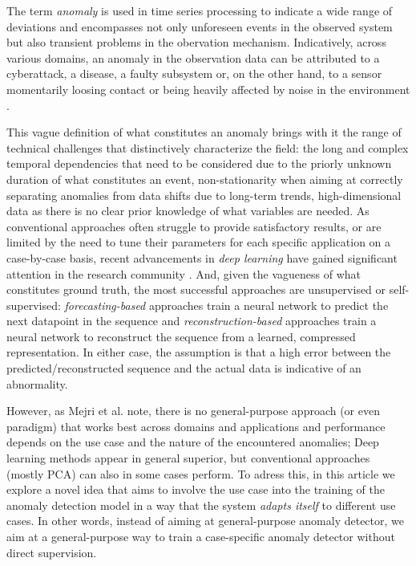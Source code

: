 \documentclass[conference]{IEEEtran}
\begin{document}
The term \emph{anomaly} is used in time series processing to indicate
a wide range of deviations and encompasses not only unforeseen events
in the observed system but also transient problems in the obervation
mechanism. Indicatively, across various domains, an anomaly in the
observation data can be attributed to a cyberattack, a disease, a
faulty subsystem or, on the other hand, to a sensor momentarily
loosing contact or being heavily affected by noise in the environment
\cite{laptev_generic_2015,geiger_tadgan:_2020,ji_novel_2021,zhou_anomaly_2021}.

This vague definition of what constitutes an anomaly brings with it
the range of technical challenges that distinctively characterize the
field: the long and complex temporal dependencies that need to be
considered due to the priorly unknown duration of what constitutes an
event, non-stationarity when aiming at correctly separating anomalies
from data shifts due to long-term trends, high-dimensional data as
there is no clear prior knowledge of what variables are needed.
As conventional approaches often struggle to provide satisfactory
results, or are limited by the need to tune their parameters for each
specific application on a case-by-case basis, recent advancements in
\emph{deep learning} have gained significant attention in the research
community \cite{MEJRI2024124922}. And, given the vagueness of what
constitutes ground truth, the most successful approaches are
unsupervised or self-supervised: \emph{forecasting-based} approaches
train a neural network to predict the next datapoint in the sequence
and \emph{reconstruction-based} approaches train a neural network to
reconstruct the sequence from a learned, compressed representation.
In either case, the assumption is that a high error between the
predicted/reconstructed sequence and the actual data is indicative of
an abnormality.

However, as Mejri et al. \cite{MEJRI2024124922} note, there is no
general-purpose approach (or even paradigm) that works best across
domains and applications and performance depends on the use case and
the nature of the encountered anomalies; Deep learning methods appear
in general superior, but conventional approaches (mostly PCA) can also
in some cases perform. To adress this, in this article we explore a
novel idea that aims to involve the use case into the training of the
anomaly detection model in a way that the system \emph{adapts itself}
to different use cases. In other words, instead of aiming at
general-purpose anomaly detector, we aim at a general-purpose way to
train a case-specific anomaly detector without direct supervision.
\end{document}
